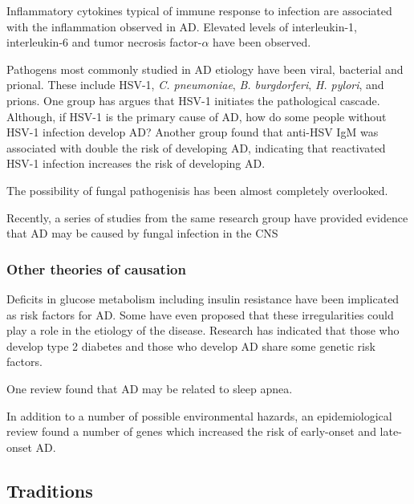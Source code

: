\documentclass[twocolumn]{article}
\begin{document}
Inflammatory cytokines typical of immune response to infection
are associated with the inflammation observed in AD.
Elevated levels of interleukin-1, interleukin-6 and
tumor necrosis factor-$\alpha$ have been observed.
\cite{
sastre2006contribution,
holmes2011systemic,
akiyama2000inflammation,
cojocaru2011study}

Pathogens most commonly studied in AD etiology have been
viral, bacterial and prional. These include
HSV-1,
\textit{C. pneumoniae},
\textit{B. burgdorferi},
\textit{H. pylori},
and prions.
One group has argues that HSV-1 initiates the pathological
cascade.
\cite{ball2013intracerebral}
Although, if HSV-1 is the primary cause of AD,
how do some people without HSV-1 infection develop AD?
Another group found that anti-HSV IgM was associated with
double the risk of developing AD, indicating that
reactivated HSV-1 infection increases the risk of developing AD.
\cite{lovheim2014reactivated}

The possibility of fungal pathogenisis
has been almost completely overlooked.
\cite{mawanda2013can}

Recently, a series of studies from the same research
group have provided evidence that AD may be caused
by fungal infection in the CNS
\cite{
pisa2015different,
alonso2013fungal,
pisa2015direct
}




\subsubsection{Other theories of causation}

Deficits in glucose metabolism including
insulin resistance have been implicated as
risk factors for AD.
\cite{erickson2013blood}
Some have even proposed that
these irregularities could play a role in
the etiology of the disease.
\cite{luque2014oxidative}
Research has indicated that those who develop
type 2 diabetes and those who develop AD
share some genetic risk factors.
\cite{hao2015shared}


One review found that AD may be related to sleep apnea.
\cite{pan2014can}


In addition to a number of possible environmental hazards,
an epidemiological review found a number of genes which
increased the risk of early-onset and late-onset AD.
\cite{jiang2013epidemiology}




\subsection{Traditions}
\end{document}
